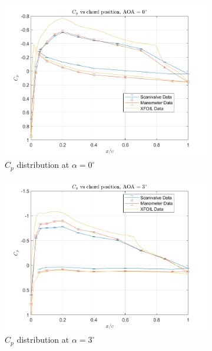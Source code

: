 \documentclass[runningheads]{llncs}
\begin{document}
\newpage
\begin{figure}[h]
    \centering
    \begin{subfigure}[b]{0.3\textwidth}
        \centering
        \includegraphics[width=\textwidth]{figures/AOA0.png}
        \caption{$C_p$ distribution at $\alpha = 0^\circ$}
        \label{fig:cp_0}
    \end{subfigure}
    \begin{subfigure}[b]{0.3\textwidth}
        \centering
        \includegraphics[width=\textwidth]{figures/AOA3.png}
        \caption{$C_p$ distribution at $\alpha = 3^\circ$}
        \label{fig:cp_3}
    \end{subfigure}
    \begin{subfigure}[b]{0.3\textwidth}

\end{subfigure}
\end{figure}
\end{document}
